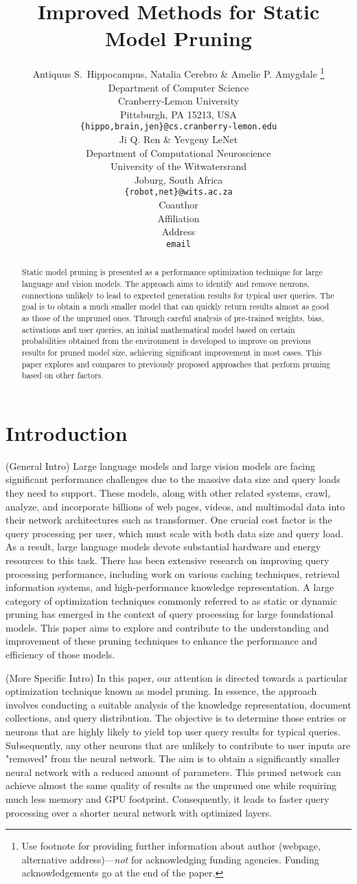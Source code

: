 \documentclass{article} %
\title{Improved Methods for Static Model Pruning}
\author{Antiquus S.~Hippocampus, Natalia Cerebro \& Amelie P. Amygdale \thanks{ Use footnote for providing further information
about author (webpage, alternative address)---\emph{not} for acknowledging
funding agencies.  Funding acknowledgements go at the end of the paper.} \\
Department of Computer Science\\
Cranberry-Lemon University\\
Pittsburgh, PA 15213, USA \\
\texttt{\{hippo,brain,jen\}@cs.cranberry-lemon.edu} \\
\And
Ji Q. Ren \& Yevgeny LeNet \\
Department of Computational Neuroscience \\
University of the Witwatersrand \\
Joburg, South Africa \\
\texttt{\{robot,net\}@wits.ac.za} \\
\AND
Coauthor \\
Affiliation \\
Address \\
\texttt{email}
}
\begin{document}
\maketitle

\begin{abstract}
Static model pruning is presented as a performance optimization technique for large language and vision models. The approach aims to identify and remove neurons, connections unlikely to lead to expected generation results for typical user queries. The goal is to obtain a much smaller model that can quickly return results almost as good as those of the unpruned ones. Through careful analysis of pre-trained weights, bias, activations and user queries, an initial mathematical model based on certain probabilities obtained from the environment is developed to improve on previous results for pruned model size, achieving significant improvement in most cases. This paper explores and compares to previously proposed approaches that perform pruning based on other factors.
\end{abstract}

\section{Introduction}
\label{intro}
(General Intro) Large language models and large vision models are facing significant performance challenges due to the massive data size and query loads they need to support. These models, along with other related systems, crawl, analyze, and incorporate billions of web pages, videos, and multimodal data into their network architectures such as transformer. 
One crucial cost factor is the query processing per user, which must scale with both data size and query load. As a result, large language models devote substantial hardware and energy resources to this task. There has been extensive research on improving query processing performance, including work on various caching techniques, retrieval information systems, and high-performance knowledge representation. 
A large category of optimization techniques commonly referred to as static or dynamic pruning has emerged in the context of query processing for large foundational models. This paper aims to explore and contribute to the understanding and improvement of these pruning techniques to enhance the performance and efficiency of those models.

(More Specific Intro) In this paper, our attention is directed towards a particular optimization technique known as model pruning. In essence, the approach involves conducting a suitable analysis of the knowledge representation, document collections, and query distribution. The objective is to determine those entries or neurons that are highly likely to yield top user query results for typical queries. Subsequently, any other neurons that are unlikely to contribute to user inputs are "removed" from the neural network. The aim is to obtain a significantly smaller neural network with a reduced amount of parameters. This pruned network can achieve almost the same quality of results as the unpruned one while requiring much less memory and GPU footprint. Consequently, it leads to faster query processing over a shorter neural network with optimized layers.
\end{document}
